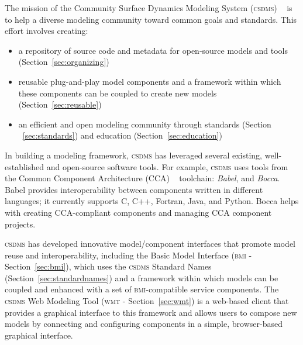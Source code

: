\documentclass[11pt, oneside]{amsart}
\DeclareRobustCommand{\csdms}{\textsc{csdms}}
\DeclareRobustCommand{\bmi}{\textsc{bmi}}
\DeclareRobustCommand{\wmt}{\textsc{wmt}}
\begin{document}
The mission of the Community Surface Dynamics Modeling System (\csdms{})
~\cite{peckham2012component} is to help a diverse modeling community toward
common goals and standards.
This effort involves creating:
\begin{itemize}
  \item a repository of source code and metadata for open-source models and
    tools (Section~\ref{sec:organizing})
  \item reusable plug-and-play model components and a framework
        within which these components can be coupled to create new models
        (Section~\ref{sec:reusable})
  \item an efficient and open modeling community through standards (Section
        ~\ref{sec:standards}) and education (Section~\ref{sec:education})
\end{itemize}


In building a modeling framework, \csdms{} has leveraged
several existing, well-established and open-source software tools. For example,
\csdms{} uses tools from the Common Component Architecture (CCA)
~\cite{armstrong1999toward} toolchain: \emph{Babel}, and \emph{Bocca}. Babel
provides interoperability between components
written in different languages; it currently supports C, C++, Fortran, Java,
and Python. Bocca helps with creating CCA-compliant components and managing CCA
component projects.

\csdms{} has developed innovative model/component interfaces that promote
model reuse and interoperability,
including the Basic Model Interface (\bmi{} - Section~\ref{sec:bmi}), which
uses
the \csdms{} Standard Names (Section~\ref{sec:standardnames}) and a framework
within which models can be coupled and enhanced with a set of \bmi{}-compatible
service components.
The \csdms{} Web Modeling Tool (\wmt{} - Section~\ref{sec:wmt}) is a web-based client that provides a
graphical interface to this framework and allows users to compose new models
by connecting and configuring components in a simple, browser-based graphical
interface.
\end{document}
